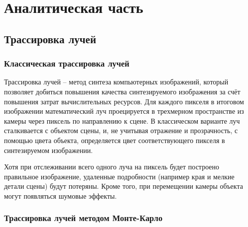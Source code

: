 \chapter{Аналитическая часть}

\section{Трассировка лучей}

\subsection{Классическая трассировка лучей}

 


Трассировка лучей -- метод синтеза компьютерных изображений, который позволяет добиться повышения качества синтезируемого изображения за счёт повышения затрат вычислительных ресурсов.
Для каждого пикселя в итоговом изображении математический луч проецируется в трехмерном пространстве из камеры через пиксель по направлению к сцене. В классическом варианте луч сталкивается с объектом сцены, и, не учитывая отражение и прозрачность, с помощью цвета объекта, определяется цвет соответствующего пикселя в синтезируемом изображении.

Хотя при отслеживании всего одного луча на пиксель будет построено правильное изображение, удаленные подробности (например края и мелкие детали сцены) будут потеряны. Кроме того, при перемещении камеры объекта могут появляться шумовые эффекты.

 
\subsection{Трассировка лучей методом Монте-Карло}

